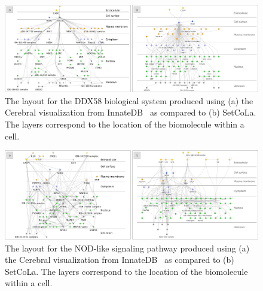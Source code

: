 \documentclass{egpubl}
\begin{document}
\begin{figure}[t]
  \centering
  \includegraphics[width=\textwidth]{figures/innatedb-ddx58.pdf}
  \vspace{-15px} {\caption{\label{fig:ddx58Innate} 
    The layout for the DDX58 biological system produced using 
    (a) the Cerebral visualization from InnateDB~\cite{innatedb:ddx58}
    as compared to (b) SetCoLa. The layers correspond to the 
    location of the biomolecule within a cell.
  }}
  \vspace{-10px}
\end{figure}

\begin{figure}[t]
  \centering
  \includegraphics[width=\textwidth]{figures/innatedb-nod.pdf}
  \vspace{-15px} {\caption{\label{fig:nodInnate} 
    The layout for the NOD-like signaling pathway produced using 
    (a) the Cerebral visualization from InnateDB~\cite{innatedb:nod}
    as compared to (b) SetCoLa. The layers correspond to the 
    location of the biomolecule within a cell.
  }}
  \vspace{-10px}
\end{figure}
\end{document}
